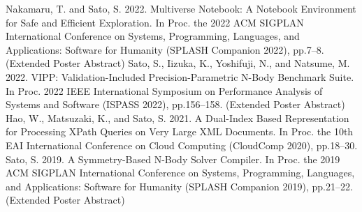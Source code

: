 \documentclass[a4paper,dvipdfmx]{article}
\newcounter{pubcount}
\begin{document}
\renewcommand{\refname}{Publications (Posters, Non-refereed)}
\begin{thebibliography}{100}
 \setcounter{enumiv}{\thepubcount}
  Nakamaru, T. and Sato, S. 2022. Multiverse Notebook: A Notebook Environment for Safe and Efficient Exploration. In Proc. the 2022 ACM SIGPLAN International Conference on Systems, Programming, Languages, and Applications: Software for Humanity (SPLASH Companion 2022), pp.7–8. (Extended Poster Abstract)
  Sato, S., Iizuka, K., Yoshifuji, N., and Natsume, M. 2022. VIPP: Validation-Included Precision-Parametric N-Body Benchmark Suite. In Proc. 2022 IEEE International Symposium on Performance Analysis of Systems and Software (ISPASS 2022), pp.156–158. (Extended Poster Abstract)
  Hao, W., Matsuzaki, K., and Sato, S. 2021. A Dual-Index Based Representation for Processing XPath Queries on Very Large XML Documents. In Proc. the 10th EAI International Conference on Cloud Computing (CloudComp 2020), pp.18–30.
  Sato, S. 2019. A Symmetry-Based N-Body Solver Compiler. In Proc. the 2019 ACM SIGPLAN International Conference on Systems, Programming, Languages, and Applications: Software for Humanity (SPLASH Companion 2019), pp.21–22. (Extended Poster Abstract)
\end{thebibliography}
\end{document}
